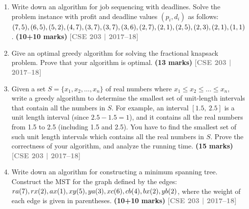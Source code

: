 \documentclass[12pt,a3paper]{article}
\newcommand{\yr}[1]{\hfill\textcolor{gray}{\small\textbf{[#1]}}}
\newcommand{\mk}[1]{\textcolor{orange!70!black}{\small\textbf{(#1 marks)}}}
\begin{document}
\begin{enumerate}
\begin{center}
\begin{tikzpicture}[
    every node/.style={circle, draw, minimum size=0.9cm, font=\bfseries},
    edge label/.style={rectangle, draw=none, font=\normalfont\small},
  ]
  \end{tikzpicture}

\end{center}


\item Write down an algorithm for job sequencing with deadlines. Solve the problem instance with profit and deadline values $(p_i, d_i)$ as follows: $(7,5),(6,5),(5,2),(4,7),(3,7),\\(3,7),(3,6),(2,7),(2,1),(2,5),(2,3),(2,1),(1,1)$. \mk{10+10}
\yr{CSE 203 | 2017--18}


\item Give an optimal greedy algorithm for solving the fractional knapsack problem. Prove that your algorithm is optimal. \mk{13}
\yr{CSE 203 | 2017--18}

\item Given a set $S = \{x_1, x_2, \ldots, x_n\}$ of real numbers where
$x_1 \leq x_2 \leq \ldots \leq x_n$, write a greedy algorithm to determine
the smallest set of unit-length intervals that contain all the numbers in $S$.
For example, an interval $[1.5,\ 2.5]$ is a unit length interval (since
$2.5 - 1.5 = 1$), and it contains all the real numbers from 1.5 to 2.5
(including 1.5 and 2.5). You have to find the smallest set of such unit length
intervals which contains all the real numbers in $S$. Prove the correctness of
your algorithm, and analyze the running time. \mk{15}\yr{CSE 203 | 2017--18}


\item Write down an algorithm for constructing a minimum spanning tree. Construct the MST for the graph defined by the edges: $ra(7), rx(2), ax(1), xy(5), ya(3), xc(6), cb(4),\\ bx(2), yb(2)$, where the weight of each edge is given in parentheses. \mk{10+10}
\yr{CSE 203 | 2017--18}


\end{enumerate}
\end{document}
